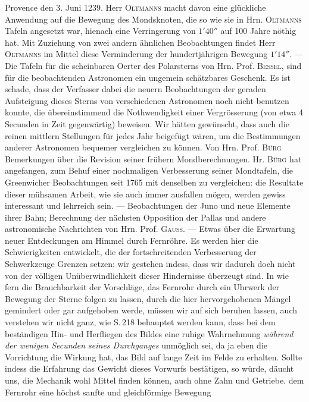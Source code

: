 Provence den 3. Juni 1239. Herr \textsc{Oltmanns} macht davon eine glückliche Anwendung auf die Bewegung
des Mondsknoten, die so wie sie in Hrn. \textsc{Oltmanns} Tafeln angesetzt war, hienach eine Verringerung
von $1'40''$ auf 100 Jahre nöthig hat. Mit Zuziehung von zwei andern ähnlichen Beobachtungen findet
Herr \textsc{Oltmanns} im Mittel diese Verminderung der hundertjährigen Bewegung $1'14''$. --- Die Tafeln für
die scheinbaren Oerter des Polarsterns von Hrn. Prof. \textsc{Bessel}, sind für die beobachtenden Astronomen
ein ungemein schätzbares Geschenk. Es ist schade, dass der Verfasser dabei die neuern Beobachtungen
der geraden Aufsteigung dieses Sterns von verschiedenen Astronomen noch nicht benutzen konnte, die
übereinstimmend die Nothwendigkeit einer Vergrösserung (von etwa 4 Secunden in Zeit gegenwärtig)
beweisen. Wir hätten gewünscht, dass auch die reinen mittlern Stellungen für jedes Jahr beigefügt
wären, um die Bestimmungen anderer Astronomen bequemer vergleichen zu können. Von Hrn. Prof.
\textsc{Bürg} Bemerkungen über die Revision seiner frühern Mondberechnungen. Hr. \textsc{Bürg} hat angefangen, zum
Behuf einer nochmaligen Verbesserung seiner Mondtafeln, die Greenwicher Beobachtungen seit 1765
mit denselben zu vergleichen: die Resultate dieser mühsamen Arbeit, wie sie auch immer ausfallen
mögen, werden gewiss interessant und lehrreich sein. --- Beobachtungen der Juno und neue Elemente
ihrer Bahn; Berechnung der nächsten Opposition der Pallas und andere astronomische Nachrichten von
Hrn. Prof. \textsc{Gauss}. --- Etwas über die Erwartung neuer Entdeckungen am Himmel durch Fernröhre. Es
werden hier die Schwierigkeiten entwickelt, die der fortschreitenden Verbesserung der Sehwerkzeuge
Grenzen setzen: wir gestehen indess, dass wir dadurch doch nicht von der völligen Unüberwindlichkeit
dieser Hindernisse überzeugt sind. In wie fern die Brauchbarkeit der Vorschläge, das Fernrohr durch
ein Uhrwerk der Bewegung der Sterne folgen zu lassen, durch die hier hervorgehobenen Mängel gemindert oder gar aufgehoben werde, müssen wir auf sich beruhen lassen, auch verstehen wir nicht ganz,
wie S.\,218 behauptet werden kann, dass bei dem beständigen Hin- und Herfliegen des Bildes eine ruhige Wahrnehmung \emph{während der wenigen Secunden seines Durchganges} unmöglich sei, da ja eben die
Vorrichtung die Wirkung hat, das Bild auf lange Zeit im Felde zu erhalten. Sollte indess die Erfahrung das Gewicht dieses Vorwurfs bestätigen, so würde, däucht uns, die Mechanik wohl Mittel finden
können, auch ohne Zahn und Getriebe. dem Fernrohr eine höchst sanfte und gleichförmige Bewegung
